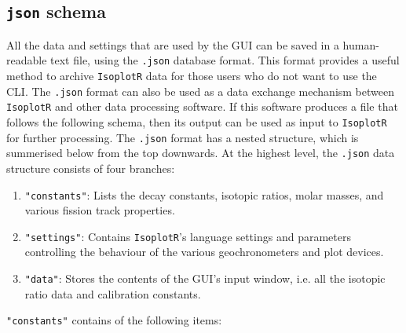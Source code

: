\begin{refsection}

\chapter{\texttt{json} schema}\label{sec:schema}

All the data and settings that are used by the GUI can be saved in a
human-readable text file, using the \texttt{.json} database format.
This format provides a useful method to archive \texttt{IsoplotR} data
for those users who do not want to use the CLI. The \texttt{.json}
format can also be used as a data exchange mechanism between
\texttt{IsoplotR} and other data processing software. If this software
produces a file that follows the following schema, then its output can
be used as input to \texttt{IsoplotR} for further processing.  The
\texttt{.json} format has a nested structure, which is summerised
below from the top downwards. At the highest level, the \texttt{.json}
data structure consists of four branches:

\begin{enumerate}
\item{\tt "constants"}: Lists the decay constants, isotopic ratios,
  molar masses, and various fission track properties.
\item{\tt "settings"}: Contains \texttt{IsoplotR}'s language
  settings and parameters controlling the behaviour of the various
  geochronometers and plot devices.
\item{\tt "data"}: Stores the contents of the GUI's input window,
  i.e. all the isotopic ratio data and calibration constants.
\end{enumerate}

\noindent\texttt{"constants"} contains of the following items:


\end{refsection}
